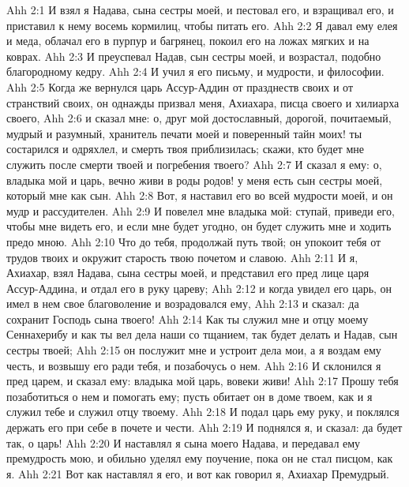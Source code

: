 \vs Ahh 2:1
И взял я Надава, сына сестры моей, и пестовал его, и взращивал его, и приставил к нему восемь кормилиц, чтобы питать его.
\vs Ahh 2:2
Я давал ему елея и меда, облачал его в пурпур и багрянец, покоил его на ложах мягких и на коврах.
\vs Ahh 2:3
И преуспевал Надав, сын сестры моей, и возрастал, подобно благородному кедру.
\vs Ahh 2:4
И учил я его письму, и мудрости, и философии.
\vs Ahh 2:5
Когда же вернулся царь Ассур-Аддин от празднеств своих и от странствий своих, он однажды призвал меня, Ахиахара, писца своего и хилиарха своего,
\vs Ahh 2:6
и сказал мне: о, друг мой достославный, дорогой, почитаемый, мудрый и разумный, хранитель печати моей и поверенный тайн моих! ты состарился и одряхлел, и смерть твоя приблизилась; скажи, кто будет мне служить после смерти твоей и погребения твоего?
\vs Ahh 2:7
И сказал я ему: о, владыка мой и царь, вечно живи в роды родов! у меня есть сын сестры моей, который мне как сын.
\vs Ahh 2:8
Вот, я наставил его во всей мудрости моей, и он мудр и рассудителен.
\vs Ahh 2:9
И повелел мне владыка мой: ступай, приведи его, чтобы мне видеть его, и если мне будет угодно, он будет служить мне и ходить предо мною.
\vs Ahh 2:10
Что до тебя, продолжай путь твой; он упокоит тебя от трудов твоих и окружит старость твою почетом и славою.
\vs Ahh 2:11
И я, Ахиахар, взял Надава, сына сестры моей, и представил его пред лице царя Ассур-Аддина, и отдал его в руку цареву;
\vs Ahh 2:12
и когда увидел его царь, он имел в нем свое благоволение и возрадовался ему,
\vs Ahh 2:13
и сказал: да сохранит Господь сына твоего!
\vs Ahh 2:14
Как ты служил мне и отцу моему Сеннахерибу и как ты вел дела наши со тщанием, так будет делать и Надав, сын сестры твоей;
\vs Ahh 2:15
он послужит мне и устроит дела мои, а я воздам ему честь, и возвышу его ради тебя, и позабочусь о нем.
\vs Ahh 2:16
И склонился я пред царем, и сказал ему: владыка мой царь, вовеки живи!
\vs Ahh 2:17
Прошу тебя позаботиться о нем и помогать ему; пусть обитает он в доме твоем, как и я служил тебе и служил отцу твоему.
\vs Ahh 2:18
И подал царь ему руку, и поклялся держать его при себе в почете и чести.
\vs Ahh 2:19
И поднялся я, и сказал: да будет так, о царь!
\vs Ahh 2:20
И наставлял я сына моего Надава, и передавал ему премудрость мою, и обильно уделял ему поучение, пока он не стал писцом, как я.
\vs Ahh 2:21
Вот как наставлял я его, и вот как говорил я, Ахиахар Премудрый.

